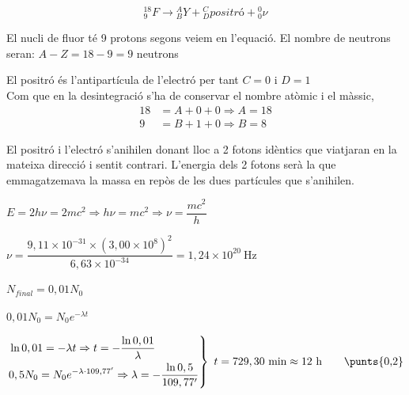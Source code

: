\begin{solapartat}
\[ {}^{18}_{9}F \rightarrow {}^{A}_{B}Y + {}^{C}_{D}\textit{positró} + {}^{0}_{0}\nu \]

 El nucli de fluor té 9 protons segons veiem en l'equació. El nombre de neutrons seran: $A - Z = 18 - 9 = 9$ neutrons

 El positró és l'antipartícula de l'electró per tant $C = 0$ i $D = 1$\\
Com que en la desintegració s'ha de conservar el nombre atòmic i el màssic,
\begin{align*}
18 &= A + 0 + 0 \Rightarrow A = 18\\
9 &= B + 1 + 0 \Rightarrow B = 8
\end{align*}

El positró i l'electró s'anihilen donant lloc a 2 fotons idèntics que viatjaran en la mateixa direcció i sentit contrari. L'energia dels 2 fotons serà la que emmagatzemava la massa en repòs de les dues partícules que s'anihilen.

 $E = 2h\nu = 2mc^2 \Rightarrow h\nu = mc^2 \Rightarrow \nu = \dfrac{mc^2}{h}$

 $\nu = \dfrac{9,11\times 10^{-31}\times\left(3,00\times 10^{8}\right)^2}{6,63\times 10^{-34}} = 1,24\times 10^{20}\ \mathrm{Hz}$
\end{solapartat}

\begin{solapartat}
 $N_\mathit{final} = 0,01N_0$

 $0,01N_0 = N_0 e^{-\lambda t}$

\[ \left.\begin{aligned}
&\ln 0,01 = -\lambda t \Rightarrow t = -\frac{\ln 0,01}{\lambda}\\
&0,5N_0 = N_0 e^{-\lambda\cdot 109,77'} \Rightarrow \lambda = -\frac{\ln 0,5}{109,77'}
\end{aligned}\right\}\ t = 729,30\ \mathrm{min} \approx 12\ \mathrm{h} \qquad \text{\punts{0,2}} \]
\end{solapartat}
